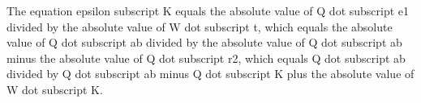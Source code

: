 The equation epsilon subscript K equals the absolute value of Q dot subscript e1 divided by the absolute value of W dot subscript t, which equals the absolute value of Q dot subscript ab divided by the absolute value of Q dot subscript ab minus the absolute value of Q dot subscript r2, which equals Q dot subscript ab divided by Q dot subscript ab minus Q dot subscript K plus the absolute value of W dot subscript K.